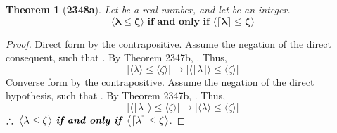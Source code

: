 \documentclass[preview]{standalone}
\newtheorem{theorem}{Theorem}
\begin{document}
\begin{theorem}[\textbf{2348a}]
    Let \bm{$\lambda$} be a real number, 
    and let \bm{$\zeta$} be an integer.
    \begin{equation*}
        \bm{
        \big \langle \lambda \le \zeta \big \rangle
            \textbf{ if and only if } 
        \big \langle \lceil \lambda \rceil \le \zeta \big \rangle
        }
    \end{equation*}
\end{theorem}

\begin{proof}
    Direct form by the contrapositive. 
    Assume the negation of the direct consequent,
    such that \bm{$\lceil \lambda \rceil > \zeta$}. 
    By Theorem 2347b, 
    \bm{$\lambda > \zeta$}.
    Thus,
    \begin{equation*}
        \bigg[
            \Big \langle \lambda \Big \rangle
                \leq 
            \Big \langle \zeta \Big \rangle
        \bigg]
            \rightarrow 
        \bigg[
            \Big \langle \lceil \lambda \rceil \Big \rangle
                \leq 
            \Big \langle \zeta \Big \rangle
        \bigg]
    \end{equation*}
    Converse form by the contrapositive. 
    Assume the negation of the direct hypothesis, 
    such that \bm{$\lambda > \zeta$}.
    By Theorem 2347b, \bm{$\lceil \lambda \rceil > \zeta$}. 
    Thus,
    \begin{equation*}
        \bigg[
            \Big \langle \lceil \lambda \rceil \Big \rangle
                \leq 
            \Big \langle \zeta \Big \rangle
        \bigg]
            \rightarrow 
        \bigg[
            \Big \langle \lambda \Big \rangle
                \leq 
            \Big \langle \zeta \Big \rangle
        \bigg]
    \end{equation*}
    $\therefore \text{\space} \relax{
        \big \langle \lambda \le \zeta \big \rangle
            \textbf{ \emph{if and only if} } 
        \big \langle \lceil \lambda \rceil \le \zeta \big \rangle}
    $.
\end{proof}
\end{document}
